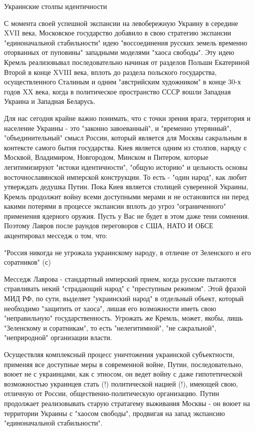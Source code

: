 Украинские столпы идентичности

С момента своей успешной экспансии на левобережную Украину в середине XVII века, Московское государство добавило в свою стратегию экспансии "единоначальной стабильности" идею "воссоединения русских земель временно оторванных от пуповины" западными моделями "хаоса свободы". Эту идею Кремль реализовывал последовательно начиная от разделов Польши Екатериной Второй в конце XVIII века, вплоть до раздела польского государства, осуществленного Сталиным и одним "австрийским художником" в конце 30-х годов XX века, когда в политическое пространство СССР вошли Западная Украина и Западная Беларусь.

Для нас сегодня крайне важно понимать, что с точки зрения врага, территория и население Украины - это "законно завоеванный", и "временно утерянный", "объединительный" смысл России, который является для Москвы сакральным в контексте самого бытия государства. Киев является одним из столпов, наряду с Москвой, Владимиром, Новгородом, Минском и Питером, которые легитимизируют "истоки идентичности", "общую историю" и цельность основы восточнославянской имперской конструкции. То есть - "один народ", как любит утверждать дедушка Путин. Пока Киев является столицей суверенной Украины, Кремль продолжит войну всеми доступными мерами и не остановится ни перед какими потерями в процессе экспансии вплоть до угроз "ограниченного" применения ядерного оружия. Пусть у Вас не будет в этом даже тени сомнения. Поэтому Лавров после раундов переговоров с США, НАТО И ОБСЕ акцентировал месседж о том, что:

"Россия никогда не угрожала украинскому народу, в отличие от Зеленского и его соратников" (с)

Месседж Лаврова - стандартный имперский прием, когда русские пытаются стравливать некий "страдающий народ" с "преступным режимом". Этой фразой МИД РФ, по сути, выделяет "украинский народ" в отдельный объект, который необходимо "защитить от хаоса", лишая его возможности иметь свою "неправильную" государственность. Угрожать же Кремль, может, якобы, лишь "Зеленскому и соратникам", то есть "нелегитимной", "не сакральной", "неприродной" организации власти.

Осуществляя комплексный процесс уничтожения украинской субъектности, применяя все доступные меры в современной войне, Путин, последовательно, воюет не с украинцами, как с этносом, он ведет войну с даже гипотетической возможностью украинцев стать (!) политической нацией (!), имеющей свою, отличную от России, общественно-политическую организацию. Путин продолжает реализовывать старую стратагему выживания Москвы - он воюет на территории Украины с "хаосом свободы", продвигая на запад экспансию "единоначальной стабильности".

